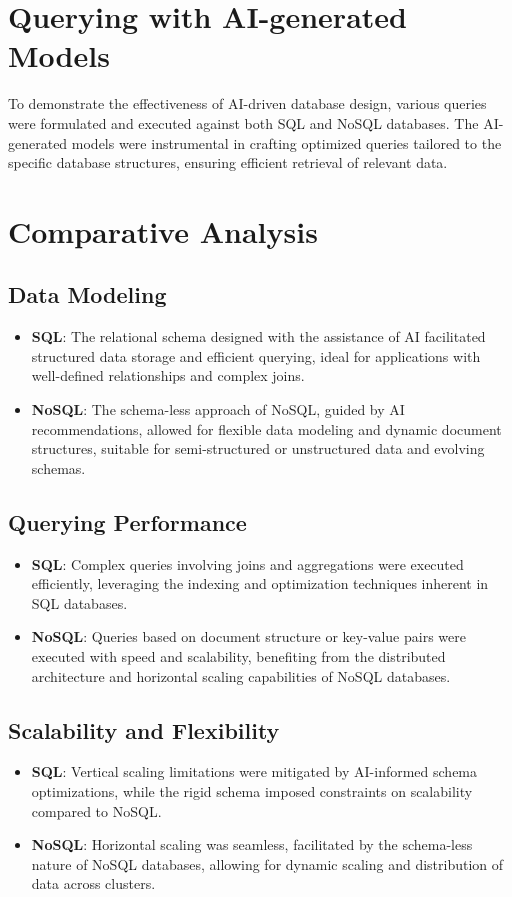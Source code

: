 \documentclass{article}
\begin{document}
\section{Querying with AI-generated Models}
To demonstrate the effectiveness of AI-driven database design, various queries were formulated and executed against both SQL and NoSQL databases. The AI-generated models were instrumental in crafting optimized queries tailored to the specific database structures, ensuring efficient retrieval of relevant data.

\section{Comparative Analysis}
\subsection{Data Modeling}
\begin{itemize}
    \item \textbf{SQL}: The relational schema designed with the assistance of AI facilitated structured data storage and efficient querying, ideal for applications with well-defined relationships and complex joins.
    \item \textbf{NoSQL}: The schema-less approach of NoSQL, guided by AI recommendations, allowed for flexible data modeling and dynamic document structures, suitable for semi-structured or unstructured data and evolving schemas.
\end{itemize}

\subsection{Querying Performance}
\begin{itemize}
    \item \textbf{SQL}: Complex queries involving joins and aggregations were executed efficiently, leveraging the indexing and optimization techniques inherent in SQL databases.
    \item \textbf{NoSQL}: Queries based on document structure or key-value pairs were executed with speed and scalability, benefiting from the distributed architecture and horizontal scaling capabilities of NoSQL databases.
\end{itemize}

\subsection{Scalability and Flexibility}
\begin{itemize}
    \item \textbf{SQL}: Vertical scaling limitations were mitigated by AI-informed schema optimizations, while the rigid schema imposed constraints on scalability compared to NoSQL.
    \item \textbf{NoSQL}: Horizontal scaling was seamless, facilitated by the schema-less nature of NoSQL databases, allowing for dynamic scaling and distribution of data across clusters.
\end{itemize}
\end{document}
